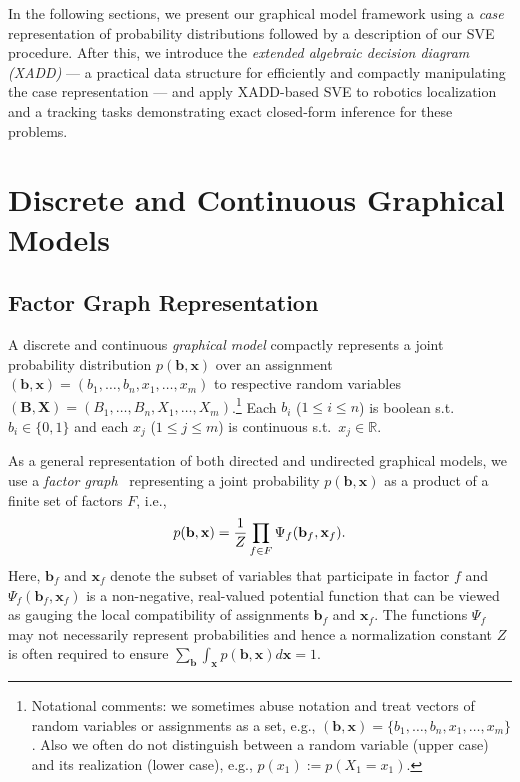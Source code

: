 \documentclass[letterpaper]{article}
\newcommand{\R}{\mathbb{R}}
\renewcommand{\vec}[1]{\mathbf{#1}}
\begin{document}
In the following sections, we present our graphical model
framework using a \emph{case} representation of probability
distributions followed by a description of our SVE procedure.  
After this, we introduce
the \emph{extended algebraic decision diagram (XADD)} --- a practical
data structure for efficiently and compactly manipulating the case
representation --- and apply XADD-based SVE to robotics localization 
and a tracking tasks demonstrating exact closed-form inference 
for these problems.  

\section{Discrete and Continuous Graphical Models}

\subsection{Factor Graph Representation}

A discrete and continuous \emph{graphical model} compactly represents
a joint probability distribution $p(\vec{b},\vec{x})$ over an
assignment $(\vec{b},\vec{x}) = ( b_1,\ldots,b_n,x_{1},\ldots,x_m )$
to respective random variables $(\vec{B},\vec{X}) =
(B_1,\ldots,B_n,X_{1},\ldots,X_m )$.\footnote{Notational comments:
we sometimes abuse notation and treat
vectors of random variables or assignments as a set, e.g., 
$(\vec{b},\vec{x}) = \{ b_1,\ldots,b_n,x_1,\ldots,x_m \}$.  
Also we often do
not distinguish between a random variable (upper case) and its
realization (lower case), e.g., $p(x_1) := p(X_1 = x_1)$.}  Each $b_i$
($1 \leq i \leq n$) is boolean s.t.\ $b_i \in \{ 0,1 \}$ and each
$x_j$ ($1 \leq j \leq m$) is continuous s.t.\ $x_j \in \R$.

As a general representation of both directed and undirected graphical
models, we use a \emph{factor graph}~\cite{factor_graph} 
representing a joint probability $p(\vec{b},\vec{x})$ as a
product of a finite set of factors $F$, i.e.,
\vspace{-2mm}
{\footnotesize
\begin{equation}
p(\vec{b},\vec{x}) = \frac{1}{Z} \prod_{f \in F} \Psi_f(\vec{b}_f,\vec{x}_f).
\label{eq:fg}
\vspace{-1mm}
\end{equation}
}
Here, $\vec{b}_f$ and $\vec{x}_f$ denote the subset of variables that
participate in factor $f$ and $\Psi_f(\vec{b}_f,\vec{x}_f)$ is a 
non-negative, real-valued 
potential function that can be viewed as gauging the local
compatibility of assignments $\vec{b}_f$ and $\vec{x}_f$.  
The functions $\Psi_f$ may not necessarily represent probabilities and
hence a normalization constant $Z$ is often required to ensure
$\sum_{\vec{b}} \int_{\vec{x}} p(\vec{b},\vec{x}) d\vec{x} = 1$.
\end{document}
